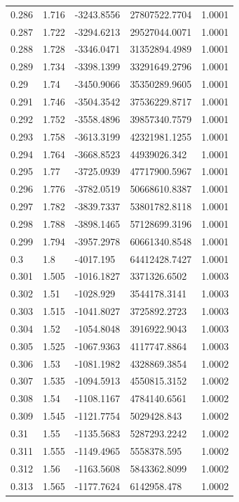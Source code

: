 \begin{tabular}{lllll}
0.286 & 1.716 & -3243.8556 & 27807522.7704 & 1.0001 \\
0.287 & 1.722 & -3294.6213 & 29527044.0071 & 1.0001 \\
0.288 & 1.728 & -3346.0471 & 31352894.4989 & 1.0001 \\
0.289 & 1.734 & -3398.1399 & 33291649.2796 & 1.0001 \\
0.29 & 1.74 & -3450.9066 & 35350289.9605 & 1.0001 \\
0.291 & 1.746 & -3504.3542 & 37536229.8717 & 1.0001 \\
0.292 & 1.752 & -3558.4896 & 39857340.7579 & 1.0001 \\
0.293 & 1.758 & -3613.3199 & 42321981.1255 & 1.0001 \\
0.294 & 1.764 & -3668.8523 & 44939026.342 & 1.0001 \\
0.295 & 1.77 & -3725.0939 & 47717900.5967 & 1.0001 \\
0.296 & 1.776 & -3782.0519 & 50668610.8387 & 1.0001 \\
0.297 & 1.782 & -3839.7337 & 53801782.8118 & 1.0001 \\
0.298 & 1.788 & -3898.1465 & 57128699.3196 & 1.0001 \\
0.299 & 1.794 & -3957.2978 & 60661340.8548 & 1.0001 \\
0.3 & 1.8 & -4017.195 & 64412428.7427 & 1.0001 \\
0.301 & 1.505 & -1016.1827 & 3371326.6502 & 1.0003 \\
0.302 & 1.51 & -1028.929 & 3544178.3141 & 1.0003 \\
0.303 & 1.515 & -1041.8027 & 3725892.2723 & 1.0003 \\
0.304 & 1.52 & -1054.8048 & 3916922.9043 & 1.0003 \\
0.305 & 1.525 & -1067.9363 & 4117747.8864 & 1.0003 \\
0.306 & 1.53 & -1081.1982 & 4328869.3854 & 1.0002 \\
0.307 & 1.535 & -1094.5913 & 4550815.3152 & 1.0002 \\
0.308 & 1.54 & -1108.1167 & 4784140.6561 & 1.0002 \\
0.309 & 1.545 & -1121.7754 & 5029428.843 & 1.0002 \\
0.31 & 1.55 & -1135.5683 & 5287293.2242 & 1.0002 \\
0.311 & 1.555 & -1149.4965 & 5558378.595 & 1.0002 \\
0.312 & 1.56 & -1163.5608 & 5843362.8099 & 1.0002 \\
0.313 & 1.565 & -1177.7624 & 6142958.478 & 1.0002 \\

\end{tabular}
